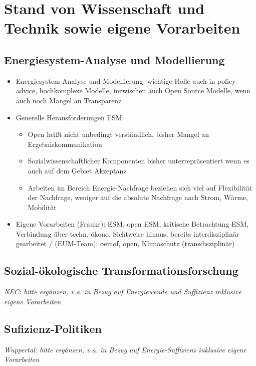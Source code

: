 \documentclass[a4paper,11pt,twoside]{scrartcl}
\begin{document}
\section{Stand von Wissenschaft und Technik sowie eigene Vorarbeiten}
\subsection*{Energiesystem-Analyse und Modellierung}
\begin{itemize}
    \item Energiesystem-Analyse und Modellierung: wichtige Rolle auch in policy advice, hochkomplexe Modelle, inzwischen auch Open Source Modelle, wenn auch noch Mangel an Transparenz
    \item Generelle Herausforderungen ESM:
    \begin{itemize}
     \item Open heißt nicht unbedingt verständlich, bisher Mangel an Ergebniskommunikation 
     \item Sozialwissenschaftlicher Komponenten bisher unterrepräsentiert wenn es auch auf dem Gebiet Akzeptanz
     \item Arbeiten im Bereich Energie-Nachfrage beziehen sich viel auf Flexibilität der Nachfrage, weniger auf die absolute Nachfrage nach Strom, Wärme, Mobilität
    \end{itemize}
    \item Eigene Vorarbeiten (Frauke): ESM, open ESM, kritische Betrachtung ESM, Verbindung über techn.-ökono. Sichtweise hinaus, bereits interdisziplinär gearbeitet / (EUM-Team): oemof, open, Klimaschutz (transdisziplinär)
\end{itemize}

\subsection*{Sozial-ökologische Transformationsforschung}
\textit{NEC: bitte ergänzen, v.a. in Bezug auf Energiewende und Suffizienz inklusive eigene Vorarbeiten}
    
\subsection*{Sufizienz-Politiken}
\textit{Wuppertal: bitte ergänzen, v.a. in Bezug auf Energie-Suffizienz inklusive eigene Vorarbeiten}
\end{document}
